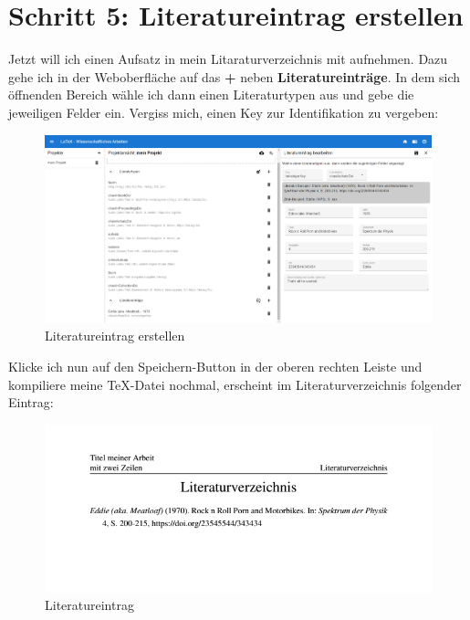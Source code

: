 \documentclass[12pt]{article}
\begin{document}
\section{Schritt 5: Literatureintrag erstellen}
Jetzt will ich einen Aufsatz in mein Litaraturverzeichnis mit aufnehmen. Dazu gehe ich in der Weboberfläche auf das \textbf{+} neben \textbf{Literatureinträge}. In dem sich öffnenden Bereich wähle ich dann einen Literaturtypen aus und gebe die jeweiligen Felder ein. Vergiss mich, einen Key zur Identifikation zu vergeben:
\FloatBarrier
\begin{figure}[!ht]
\includegraphics[width=.9\textwidth]{images/createEntry.png}
\caption{Literatureintrag erstellen}
\end{figure}
\FloatBarrier
\noindent Klicke ich nun auf den Speichern-Button in der oberen rechten Leiste und kompiliere meine TeX-Datei nochmal, erscheint im Literaturverzeichnis folgender Eintrag:
\FloatBarrier
\begin{figure}[!ht]
\includegraphics[width=.9\textwidth]{images/bibEntry.png}
\caption{Literatureintrag}
\end{figure}
\FloatBarrier
\end{document}

